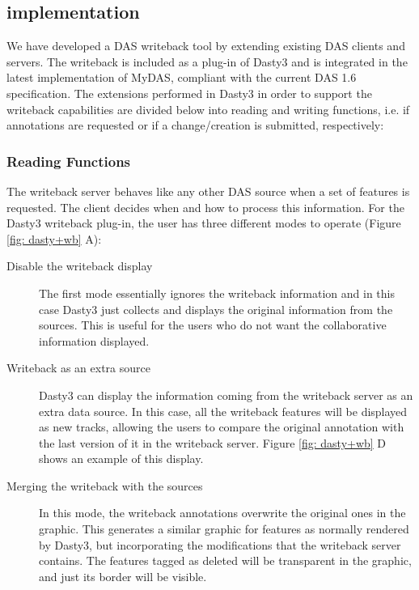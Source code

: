 \subsection{implementation}
We have developed a DAS writeback tool by extending existing DAS clients and servers. The writeback is included as a plug-in of Dasty3 and is integrated in the latest implementation of MyDAS, compliant with the current DAS 1.6 specification. The extensions performed in Dasty3 in order to support the writeback capabilities are divided below into reading and writing functions, i.e. if annotations are requested or if a change/creation is submitted, respectively:
  
\subsubsection{Reading Functions}
The writeback server behaves like any other DAS source when a set of features is requested. The client decides when and how to process this information. For the Dasty3 writeback plug-in, the user has three different modes to operate (Figure \ref{fig: dasty+wb} A): 
\begin{description}
	\item[Disable the writeback display] The first mode essentially ignores the writeback information and in this case Dasty3 just collects and displays the original information from the sources. This is useful for the users who do not want the collaborative information displayed.
	\item[Writeback as an extra source] Dasty3 can display the information coming from the writeback server as an extra data source. In this case, all the writeback features will be displayed as new tracks, allowing the users to compare the original annotation with the last version of it in the writeback server. Figure \ref{fig: dasty+wb}  D shows an example of this display.
	\item[Merging the writeback with the sources] In this mode, the writeback annotations overwrite the original ones in the graphic. This generates a similar graphic for features as normally rendered by Dasty3, but incorporating the modifications that the writeback server contains. The features tagged as deleted will be transparent in the graphic, and just its border will be visible.
\end{description}

